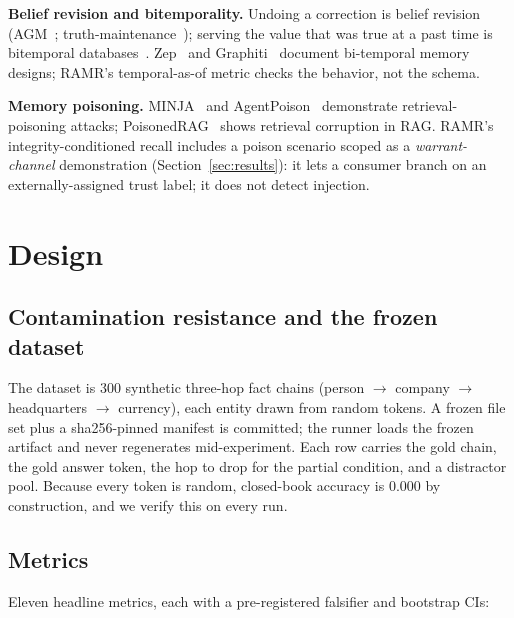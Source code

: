 \documentclass[11pt]{article}
\begin{document}
\textbf{Belief revision and bitemporality.} Undoing a correction is belief revision
(AGM~\cite{agm}; truth-maintenance~\cite{doyle}); serving the value that was true at a past time is
bitemporal databases~\cite{snodgrass}. Zep~\cite{zep} and Graphiti~\cite{graphiti} document bi-temporal
memory designs; RAMR's temporal-as-of metric checks the behavior, not the schema.

\textbf{Memory poisoning.} MINJA~\cite{minja} and AgentPoison~\cite{agentpoison} demonstrate
retrieval-poisoning attacks; PoisonedRAG~\cite{poisonedrag} shows retrieval corruption in RAG. RAMR's
integrity-conditioned recall includes a poison scenario scoped as a \emph{warrant-channel}
demonstration (Section~\ref{sec:results}): it lets a consumer branch on an externally-assigned trust
label; it does not detect injection.

\section{Design}
\label{sec:metrics}

\subsection{Contamination resistance and the frozen dataset}

The dataset is 300 synthetic three-hop fact chains (person $\to$ company $\to$ headquarters $\to$
currency), each entity drawn from random tokens. A frozen file set plus a sha256-pinned manifest is
committed; the runner loads the frozen artifact and never regenerates mid-experiment. Each row carries
the gold chain, the gold answer token, the hop to drop for the partial condition, and a distractor
pool. Because every token is random, closed-book accuracy is 0.000 by construction, and we verify this
on every run.

\subsection{Metrics}

Eleven headline metrics, each with a pre-registered falsifier and bootstrap CIs:
\end{document}
